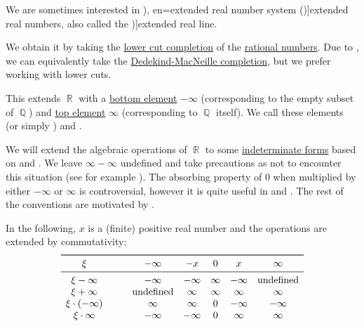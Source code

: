 \begin{definition}\label{def:extended_real_numbers}\mimprovised
  We are sometimes interested in \term[ru=расширенная вещественная прямая (\cite[23]{ИоффеТихомиров1974ЭкстремальныеЗадачи}), en=extended real number system (\cite[10]{Folland1999RealAnalysis})]{extended real numbers}, also called the \term[en=extended real line (\cite[\S 1.4]{Rudin1987RealAndComplexAnalysis})]{extended real line}.

  We obtain it by taking the \hyperref[def:lower_cut_completion]{ lower cut completion} of the \hyperref[def:rational_numbers]{rational numbers}. Due to , we can equivalently take the \hyperref[def:dedekind_macnielle_completion]{Dedekind-MacNeille completion}, but we prefer working with lower cuts.

  This extends \( \BbbR \) with a \hyperref[def:extremal_points/top_and_bottom]{bottom element} \( -\infty \) (corresponding to the empty subset of \( \BbbQ \)) and \hyperref[def:extremal_points/top_and_bottom]{top element} \( \infty \) (corresponding to \( \BbbQ \) itself). We call these elements  (or simply ) and .

  We will extend the algebraic operations of \( \BbbR \) to some \hyperref[def:indeterminate_form]{indeterminate forms} based on \cite[\S 1.1.17]{Schechter1997AnalysisHandbook} and \cite[11]{Folland1999RealAnalysis}. We leave \( \infty - \infty \) undefined and take precautions as not to encounter this situation (see for example ). The absorbing property of \( 0 \) when multiplied by either \( -\infty \) or \( \infty \) is controversial, however it is quite useful in  and . The rest of the conventions are motivated by .

  In the following, \( x \) is a (finite) positive real number and the operations are extended by commutativity:
  \begin{equation*}
    \begin{array}{c !{\qquad} *{5}{c}}
      \toprule
      \xi                 & -\infty       & -x      & 0      & x       & \infty        \\
      \midrule
      \xi - \infty        & -\infty       & -\infty & \infty & -\infty & \T{undefined} \\
      \xi + \infty        & \T{undefined} & \infty  & \infty & \infty  & \infty \\
      \xi \cdot (-\infty) & \infty        & \infty  & 0      & -\infty & -\infty \\
      \xi \cdot \infty    & -\infty       & -\infty & 0      & \infty  & \infty \\
    \end{array}
  \end{equation*}
\end{definition}
